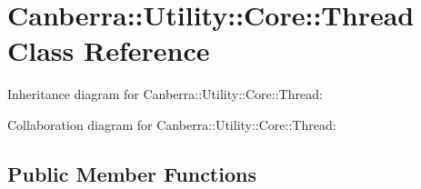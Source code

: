 \hypertarget{class_canberra_1_1_utility_1_1_core_1_1_thread}{}\section{Canberra\+:\+:Utility\+:\+:Core\+:\+:Thread Class Reference}
\label{class_canberra_1_1_utility_1_1_core_1_1_thread}


Inheritance diagram for Canberra\+:\+:Utility\+:\+:Core\+:\+:Thread\+:


Collaboration diagram for Canberra\+:\+:Utility\+:\+:Core\+:\+:Thread\+:
\subsection*{Public Member Functions}
